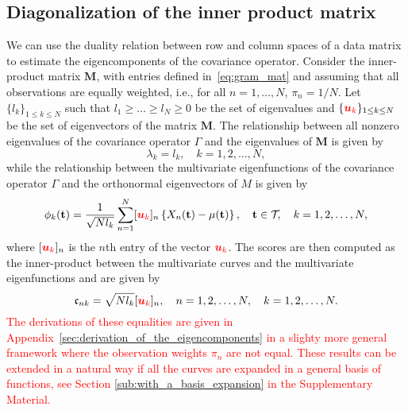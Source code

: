 \subsection{Diagonalization of the inner product matrix} %
\label{sub:by_diagonalization_of_the_inner_product_matrix}

We can use the duality relation between row and column spaces of a data matrix to estimate the eigencomponents of the covariance operator. Consider the inner-product matrix $\mathbf{M}$, with entries defined in~\eqref{eq:gram_mat} and assuming that all observations are equally weighted, i.e., for all $n = 1, \dots, N$, $\pi_n = 1/N$.
Let $\{l_k\}_{1 \leq k \leq N}$ such that $l_1 \geq \dots \geq l_N \geq 0$ be the set of eigenvalues and $\{\textcolor{red}{\boldsymbol{u}_k}\}_{1 \leq k \leq N}$ be the set of eigenvectors of the matrix $\mathbf{M}$. The relationship between all nonzero eigenvalues of the covariance operator $\Gamma$ and the eigenvalues of $\mathbf{M}$ is given by
\begin{equation}\label{eq:eigenvalues_relation_p}
    \lambda_k = l_k, \quad k = 1, 2, \dots, N,
\end{equation}
while the relationship between the multivariate eigenfunctions of the covariance operator $\Gamma$ and the orthonormal eigenvectors of $M$ is given by
\begin{equation}\label{eq:eigenfunction_relation_p}
    \phi_k(\mathbf{t}) = \frac{1}{\sqrt{N l_k}}\sum_{n = 1}^N [\textcolor{red}{\boldsymbol{u}_{k}}]_n\left\{X_n(\mathbf{t}) - \mu(\mathbf{t})\right\}, \quad \mathbf{t} \in \mathcal{T}_{}, \quad k = 1, 2, \dots, N, 
\end{equation}
where $[\textcolor{red}{\boldsymbol{u}_{k}}]_n$ is the $n$th entry of the vector $\textcolor{red}{\boldsymbol{u}_k}$. The scores are then computed as the inner-product between the multivariate curves and the multivariate eigenfunctions and are given by
\begin{equation}\label{eq:scores_relation_p}
    \mathfrak{c}_{nk} = \sqrt{N l_k}[\textcolor{red}{\boldsymbol{u}_{k}}]_n, \quad n = 1, 2, \dots, N, \quad k = 1, 2, \dots, N. 
\end{equation}
\textcolor{red}{The derivations of these equalities are given in Appendix~\ref{sec:derivation_of_the_eigencomponents} in a slighty more general framework where the observation weights $\pi_n$ are not equal. These results can be extended in a natural way if all the curves are expanded in a general basis of functions, see Section \ref{sub:with_a_basis_expansion} in the Supplementary Material.}

